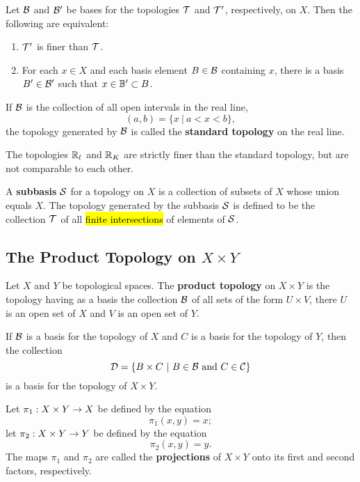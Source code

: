\vs

 Let $\mathcal{B}$ and $\mathcal{B}^\prime$ be bases for the topologies $\mathcal{T}$ and $\mathcal{T}^\prime$, respectively, on $X$. Then the following are equivalent:
\begin{enumerate}
    \item $\mathcal{T}^\prime$ is finer than $\mathcal{T}$.
    \item For each $x\in X$ and each basis element $B\in \mathcal{B}$ containing $x$, there is a basis $B^\prime \in \mathcal{B}^\prime$ such that $x\in \mathbb{B}^\prime\subset B$.
\end{enumerate}

\dfn If $\mathcal{B}$ is the collection of all open intervals in the real line,
\[(a,b) = \{x\ |\ a < x < b\},\]
the topology generated by $\mathcal{B}$ is called the \textbf{standard topology} on the real line.

\vs

 The topologies $\mathbb{R}_\ell$ and $\mathbb{R}_K$ are strictly finer than the standard topology, but are not comparable to each other.

\vs 

\dfn A \textbf{subbasis} $\mathcal{S}$ for a topology on $X$ is a collection of subsets of $X$ whose union equals $X$. The topology generated by the subbasis $\mathcal{S}$ is defined to be the collection $\mathcal{T}$ of all \hl{finite intersections} of elements of $\mathcal{S}$.

\vs

\subsection{The Product Topology on $X\times Y$}\nl


\dfn Let $X$ and $Y$ be topological spaces. The \textbf{product topology} on $X\times Y$ is the topology having as a basis the collection $\mathcal{B}$ of all sets of the form $U\times V$, there $U$ is an open set of $X$ and $V$ is an open set of $Y$.

\vs

 If $\mathcal{B}$ is a basis for the topology of $X$ and $C$ is a basis for the topology of $Y$, then the collection
\[\mathcal{D} = \{B\times C\ |\ B\in \mathcal{B}\text{ and }C\in \mathcal{C}\}\]
is a basis for the topology of $X\times Y$.

\vs

\dfn Let $\pi_1:X\times Y\rightarrow X$ be defined by the equation
\[\pi_1(x,y) = x;\]
let $\pi_2:X\times Y\rightarrow Y$ be defined by the equation
\[\pi_2(x,y) = y.\]
The maps $\pi_1$ and $\pi_2$ are called the \textbf{projections} of $X\times Y$ onto its first and second factors, respectively.

